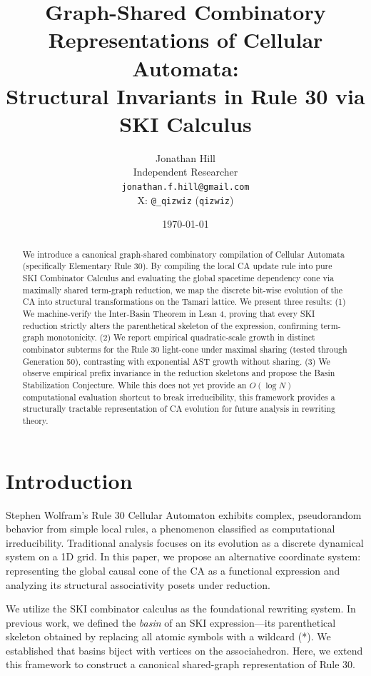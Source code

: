 \documentclass[11pt]{article}
\title{Graph-Shared Combinatory Representations of Cellular Automata:\\Structural Invariants in Rule 30 via SKI Calculus}
\author{Jonathan Hill \\ Independent Researcher \\ \texttt{jonathan.f.hill@gmail.com} \\ X: \texttt{@\_qizwiz} (\texttt{qizwiz})}
\date{\today}
\begin{document}
\maketitle

\begin{abstract}
We introduce a canonical graph-shared combinatory compilation of Cellular Automata (specifically Elementary Rule 30). By compiling the local CA update rule into pure SKI Combinator Calculus and evaluating the global spacetime dependency cone via maximally shared term-graph reduction, we map the discrete bit-wise evolution of the CA into structural transformations on the Tamari lattice. We present three results: (1) We machine-verify the Inter-Basin Theorem in Lean 4, proving that every SKI reduction strictly alters the parenthetical skeleton of the expression, confirming term-graph monotonicity. (2) We report empirical quadratic-scale growth in distinct combinator subterms for the Rule 30 light-cone under maximal sharing (tested through Generation 50), contrasting with exponential AST growth without sharing. (3) We observe empirical prefix invariance in the reduction skeletons and propose the Basin Stabilization Conjecture. While this does not yet provide an $O(\log N)$ computational evaluation shortcut to break irreducibility, this framework provides a structurally tractable representation of CA evolution for future analysis in rewriting theory.
\end{abstract}

\section{Introduction}
Stephen Wolfram's Rule 30 Cellular Automaton exhibits complex, pseudorandom behavior from simple local rules, a phenomenon classified as computational irreducibility. Traditional analysis focuses on its evolution as a discrete dynamical system on a 1D grid. In this paper, we propose an alternative coordinate system: representing the global causal cone of the CA as a functional expression and analyzing its structural associativity posets under reduction.

We utilize the SKI combinator calculus as the foundational rewriting system. In previous work, we defined the \textit{basin} of an SKI expression---its parenthetical skeleton obtained by replacing all atomic symbols with a wildcard (*). We established that basins biject with vertices on the associahedron. Here, we extend this framework to construct a canonical shared-graph representation of Rule 30.
\end{document}
